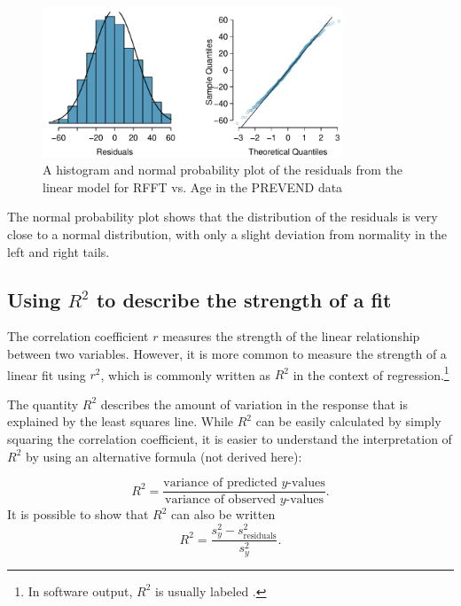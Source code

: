 \begin{figure}[h!]
	\centering
	\includegraphics[width=0.8\textwidth]
	{ch_simple_linear_regression_oi_biostat/figures/statinsResidNormPlot/statinsResidNormPlot.pdf}
	\caption{A histogram and normal probability plot of the residuals from the linear model for RFFT vs. Age in the PREVEND data}
	\label{statinsResidNormPlot}
\end{figure}

The normal probability plot shows that the distribution of the residuals is very close to a normal distribution, with only a slight deviation from normality in the left and right tails.


\subsection{Using $R^2$ to describe the strength of a fit}
\label{RSquaredLinearRegression}


The correlation coefficient $r$ measures the strength of the linear relationship between two variables. However, it is more common to measure the strength of a linear fit using $r^2$, which is commonly written as $R^2$ in the context of regression.\footnote{In software output, $R^2$ is usually labeled .} 

The quantity $R^2$ describes the amount of variation in the response that is explained by the least squares line. While $R^2$ can be easily calculated by simply squaring the correlation coefficient, it is easier to understand the interpretation of $R^2$ by using an alternative formula (not derived here):

\[R^{2} = \dfrac{\text{variance of predicted $y$-values}}{\text{variance of observed $y$-values}}.\]
It is possible to show that $R^2$ can also be written
\[R^{2} = \dfrac{s^{2}_{y} - s_{\text{residuals}}^2}{s^{2}_{y}}.\]

